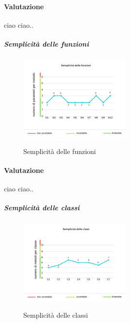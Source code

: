 	\paragraph*{Valutazione} ciao ciao..
	\pagebreak
	\subparagraph{Semplicità delle funzioni}
	\begin{center}
		\begin{figure}[h] 
			\centering 
			\includegraphics[width=0.5\textwidth]{res/images/new/semplicitaFunzioni.png}\\
			\caption{Semplicità delle funzioni}
		\end{figure}
	\end{center}
	\paragraph*{Valutazione} ciao ciao..
	\pagebreak
	\subparagraph{Semplicità delle classi}
	\begin{center}
		\begin{figure}[h] 
			\centering 
			\includegraphics[width=0.5\textwidth]{res/images/new/semplicitaClassi.png}\\
			\caption{Semplicità delle classi}
		\end{figure}
	\end{center}
